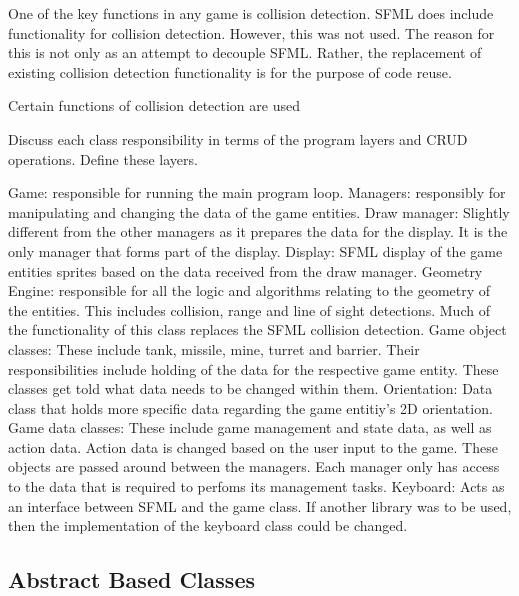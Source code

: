 \documentclass[10pt,twocolumn]{witseiepaper}
\begin{document}
One of the key functions in any game is collision detection. SFML does include functionality for collision detection. However, this was not used. The reason for this is not only as an attempt to decouple SFML. Rather, the replacement of existing collision detection functionality is for the purpose of code reuse. 

Certain functions of collision detection are used 


Discuss each class responsibility in terms of the program layers and CRUD operations. Define these layers.

Game: responsible for running the main program loop.
Managers: responsibly for manipulating and changing the data of the game entities.
Draw manager: Slightly different from the other managers as it prepares the data for the display. It is the only manager that forms part of the display.
Display: SFML display of the game entities sprites based on the data received from the draw manager.
Geometry Engine: responsible for all the logic and algorithms relating to the geometry of the entities. This includes collision, range and line of sight detections. Much of the functionality of this class replaces the SFML collision detection. 
Game object classes: These include tank, missile, mine, turret and barrier. Their responsibilities include holding of the data for the respective game entity. These classes get told what data needs to be changed within them.
Orientation: Data class that holds more specific data regarding the game entitiy's 2D orientation.
Game data classes: These include game management and state data, as well as action data. Action data is changed based on the user input to the game. These objects are passed around between the managers. Each manager only has access to the data that is required to perfoms its management tasks.
Keyboard: Acts as an interface between SFML and the game class. If another library was to be used, then the implementation of the keyboard class could be changed.

\subsection{Abstract Based Classes}




%
\end{document}
